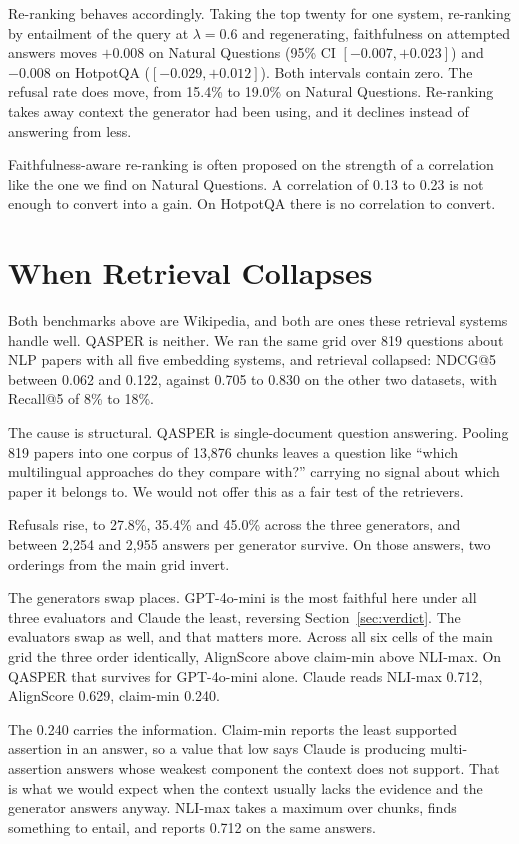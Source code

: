 \documentclass[11pt]{article}
\begin{document}
Re-ranking behaves accordingly. Taking the top twenty for one system, re-ranking by entailment of the query at $\lambda = 0.6$ and regenerating, faithfulness on attempted answers moves $+0.008$ on Natural Questions (95\% CI $[-0.007, +0.023]$) and $-0.008$ on HotpotQA ($[-0.029, +0.012]$). Both intervals contain zero. The refusal rate does move, from 15.4\% to 19.0\% on Natural Questions. Re-ranking takes away context the generator had been using, and it declines instead of answering from less.

Faithfulness-aware re-ranking is often proposed on the strength of a correlation like the one we find on Natural Questions. A correlation of 0.13 to 0.23 is not enough to convert into a gain. On HotpotQA there is no correlation to convert.


\section{When Retrieval Collapses}
\label{sec:qasper}

Both benchmarks above are Wikipedia, and both are ones these retrieval systems handle well. QASPER \citep{dasigi-etal-2021} is neither. We ran the same grid over 819 questions about NLP papers with all five embedding systems, and retrieval collapsed: NDCG@5 between 0.062 and 0.122, against 0.705 to 0.830 on the other two datasets, with Recall@5 of 8\% to 18\%.

The cause is structural. QASPER is single-document question answering. Pooling 819 papers into one corpus of 13,876 chunks leaves a question like ``which multilingual approaches do they compare with?'' carrying no signal about which paper it belongs to. We would not offer this as a fair test of the retrievers.

Refusals rise, to 27.8\%, 35.4\% and 45.0\% across the three generators, and between 2,254 and 2,955 answers per generator survive. On those answers, two orderings from the main grid invert.

The generators swap places. GPT-4o-mini is the most faithful here under all three evaluators and Claude the least, reversing Section~\ref{sec:verdict}. The evaluators swap as well, and that matters more. Across all six cells of the main grid the three order identically, AlignScore above claim-min above NLI-max. On QASPER that survives for GPT-4o-mini alone. Claude reads NLI-max 0.712, AlignScore 0.629, claim-min 0.240.

The 0.240 carries the information. Claim-min reports the least supported assertion in an answer, so a value that low says Claude is producing multi-assertion answers whose weakest component the context does not support. That is what we would expect when the context usually lacks the evidence and the generator answers anyway. NLI-max takes a maximum over chunks, finds something to entail, and reports 0.712 on the same answers.
\end{document}
